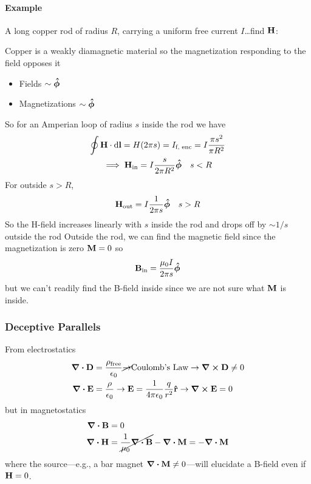 \documentclass[../main.tex]{subfiles}
\begin{document}
\paragraph{Example} A long copper rod of radius $R$, carrying a uniform free current $I$\dots find $\vb H$:

Copper is a weakly diamagnetic material so the magnetization responding to the field opposes it

\begin{itemize}
    \item Fields $\sim \vu*\phi$
    \item Magnetizations $\sim \vu*\phi$
\end{itemize}
So for an Amperian loop of radius $s$ inside the rod we have
\begin{gather*}
    \oint \vb H \cdot \dd{\vb l} = H (2\pi s) = I_\text{f, enc} = I \frac{\pi s^2}{\pi R^2} \\
    \implies \vb H_\text{in} = I \frac{s}{2\pi R^2} \vu*\phi \quad s < R
\end{gather*}
For outside $s > R$,
\begin{align*}
    \vb H_\text{out} = I \frac{1}{2\pi s} \vu*\phi \quad s > R
\end{align*}
So the H-field increases linearly with $s$ inside the rod and drops off by $\sim 1/s$ outside the rod
Outside the rod, we can find the magnetic field since the magnetization is zero $\vb M = 0$ so
\begin{align*}
    \vb B_\text{in} = \frac{\mu_0 I}{2\pi s} \vu*\phi
\end{align*}
but we can't readily find the B-field inside since we are not sure what $\vb M$ is inside.

\subsubsection{Deceptive Parallels}
From electrostatics
\begin{align*}
    \div \vb D &= \frac{\rho_\text{free}}{\epsilon_0} \cancel{\to} \textrm{Coulomb's Law} \to \curl \vb D \neq 0 \\
    \div \vb E &= \frac{\rho}{\epsilon_0} \to \vb E = \frac{1}{4\pi\epsilon_0} \frac{q}{r^2} \vu r \to \curl \vb E = 0
\end{align*}
but in magnetostatics
\begin{align*}
    \div \vb B &= 0 \\
    \div \vb H &= \cancel{\frac{1}{\mu_0} \div \vb B} - \div \vb M = -\div \vb M
\end{align*}
where the source---e.g., a bar magnet $\div \vb M \neq 0$---will elucidate a B-field even if $\vb H = 0$.
\end{document}
